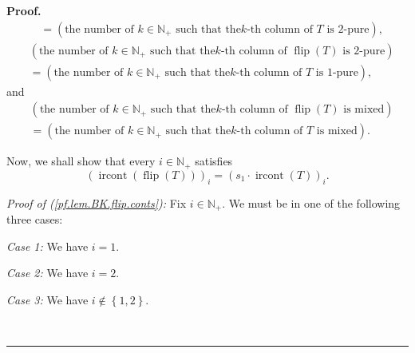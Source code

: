 \documentclass[numbers=enddot,12pt,final,onecolumn,notitlepage]{scrartcl}%
\theoremstyle{definition}
\newenvironment{proof}[1][Proof]{\noindent\textbf{#1.} }{\ \rule{0.5em}{0.5em}}
\newenvironment{verlong}{}{}
\begin{document}
\begin{verlong}
\begin{proof}
\begin{align*}
&  =\left(  \text{the number of }k\in\mathbb{N}_{+}\text{ such that the
}k\text{-th column of }T\text{ is 2-pure}\right)  ,
\end{align*}%
\begin{align*}
&  \left(  \text{the number of }k\in\mathbb{N}_{+}\text{ such that the
}k\text{-th column of }\operatorname*{flip}\left(  T\right)  \text{ is
2-pure}\right) \\
&  =\left(  \text{the number of }k\in\mathbb{N}_{+}\text{ such that the
}k\text{-th column of }T\text{ is 1-pure}\right)  ,
\end{align*}
and%
\begin{align*}
&  \left(  \text{the number of }k\in\mathbb{N}_{+}\text{ such that the
}k\text{-th column of }\operatorname*{flip}\left(  T\right)  \text{ is
mixed}\right) \\
&  =\left(  \text{the number of }k\in\mathbb{N}_{+}\text{ such that the
}k\text{-th column of }T\text{ is mixed}\right)  .
\end{align*}


Now, we shall show that every $i\in\mathbb{N}_{+}$ satisfies%
\begin{equation}
\left(  \operatorname*{ircont}\left(  \operatorname*{flip}\left(  T\right)
\right)  \right)  _{i}=\left(  s_{1}\cdot\operatorname*{ircont}\left(
T\right)  \right)  _{i}. \label{pf.lem.BK.flip.conts}%
\end{equation}


\textit{Proof of (\ref{pf.lem.BK.flip.conts}):} Fix $i\in\mathbb{N}_{+}$. We
must be in one of the following three cases:

\textit{Case 1:} We have $i=1$.

\textit{Case 2:} We have $i=2$.

\textit{Case 3:} We have $i\notin\left\{  1,2\right\}  $.


\end{proof}
\end{verlong}
\end{document}
